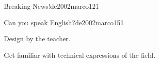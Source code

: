 \begin{syllabus}
\begin{unit}{Breaking News!}{}{de2002marco}{12}{1}
\end{unit}

\begin{unit}{Can you speak English?}{}{de2002marco}{15}{1}
   \begin{topics}
      \item Design by the teacher.
   \end{topics}

   \begin{learningoutcomes}
      \item Get familiar with technical expressions of the field.
   \end{learningoutcomes}
\end{unit}

\begin{coursebibliography}
\end{coursebibliography}
\end{syllabus}

